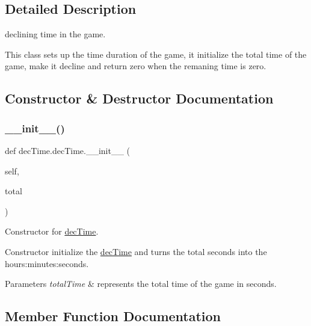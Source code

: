 \subsection{Detailed Description}
declining time in the game. 

This class sets up the time duration of the game, it initialize the total time of the game, make it decline and return zero when the remaning time is zero. 

\subsection{Constructor \& Destructor Documentation}
\mbox{\label{classdec_time_1_1dec_time_a347077af854df5ad2e55078cab68c0cd}} 
\subsubsection{\texorpdfstring{\_\_init\_\_()}{\_\_init\_\_()}}
{\footnotesize\ttfamily def dec\+Time.\+dec\+Time.\+\_\+\+\_\+init\+\_\+\+\_\+ (\begin{DoxyParamCaption}\item[{}]{self,  }\item[{}]{total }\end{DoxyParamCaption})}



Constructor for \mbox{\hyperlink{classdec_time_1_1dec_time}{dec\+Time}}. 

Constructor initialize the \mbox{\hyperlink{classdec_time_1_1dec_time}{dec\+Time}} and turns the total seconds into the hours\+:minutes\+:seconds. 
\begin{DoxyParams}{Parameters}
{\em total\+Time} & represents the total time of the game in seconds. \\
\hline
\end{DoxyParams}


\subsection{Member Function Documentation}
\mbox{\label{classdec_time_1_1dec_time_abc74b9f7ad93fd128906664aedc18979}} 
